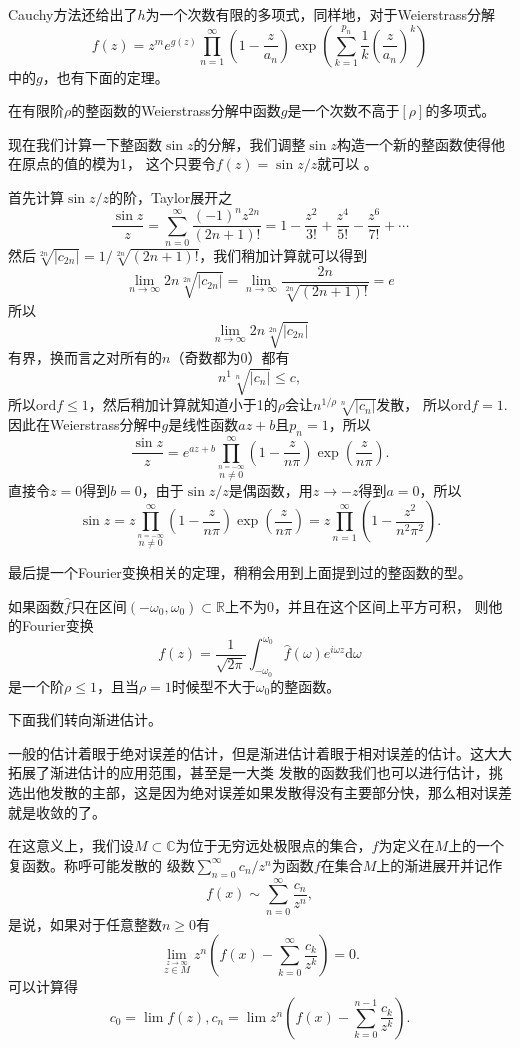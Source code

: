 Cauchy方法还给出了$h$为一个次数有限的多项式，同样地，对于Weierstrass分解
\[
f(z)=z^me^{g(z)}\prod_{n=1}^\infty  \left(1-\frac{z}{a_n}\right)\exp\left(\sum_{k=1}^{p_n}
\frac{1}{k}\left(\frac{z}{a_n}\right)^k\right)
\]
中的$g$，也有下面的定理。
\begin{thm}[Hadamard]
在有限阶$\rho$的整函数的Weierstrass分解中函数$g$是一个次数不高于$[\rho]$的多项式。
\end{thm}
现在我们计算一下整函数$\sin z$的分解，我们调整$\sin z$构造一个新的整函数使得他在原点的值的模为1，
这个只要令$f(z)=\sin z /z$就可以 。

首先计算$\sin z /z$的阶，Taylor展开之
\[
\frac{\sin z}{z}= \sum_{n=0}^\infty \frac{(-1)^nz^{2n}}{(2n+1)!}= 1 - \frac{z^2}{3!} + \frac{z^4}{5!} - 
\frac{z^6}{7!} + \cdots 
\]
然后$\sqrt[2n]{|c_{2n}|}=1/\sqrt[2n]{(2n+1)!}$，我们稍加计算就可以得到
\[
\lim_{n\to \infty} 2n\sqrt[2n]{|c_{2n}|}=\lim_{n\to \infty} \frac{2n}{\sqrt[2n]{(2n+1)!}}=e
\]
所以\[\lim_{n\to \infty} 2n\sqrt[2n]{|c_{2n}|}\]有界，换而言之对所有的$n$（奇数都为0）都有
\[
n^{1}\sqrt[n]{|c_n|}\leq c,
\]
所以$\mathrm{ord} f\leq 1$，然后稍加计算就知道小于1的$\rho$会让$n^{1/\rho}\sqrt[n]{|c_n|}$发散，
所以$\mathrm{ord} f=1$.因此在Weierstrass分解中$g$是线性函数$az+b$且$p_n=1$，所以
\[
\frac{\sin z}{z}=e^{az+b}\prod_{\stackrel{n=-\infty}{n\neq 0}}^\infty  \left(1-\frac{z}{n\pi}\right)
\exp\left(\frac{z}{n\pi}\right).
\]
直接令$z=0$得到$b=0$，由于$\sin z/z$是偶函数，用$z \to -z$得到$a=0$，所以
\[
\sin z=z\prod_{\stackrel{n=-\infty}{n\neq 0}}^\infty  \left(1-\frac{z}{n\pi}\right)\exp\left(\frac{z}{n\pi}\right)
=z\prod_{n=1}^\infty  \left(1-\frac{z^2}{n^2\pi^2}\right).
\]

最后提一个Fourier变换相关的定理，稍稍会用到上面提到过的整函数的型。
\begin{pro}
如果函数$\hat{f}$只在区间$(-\omega_0,\omega_0)\subset \mathbb{R}$上不为$0$，并且在这个区间上平方可积，
则他的Fourier变换
\[
f(z)=\frac{1}{\sqrt{2\pi}}\int_{-\omega_0}^{\omega_0} \hat{f}(\omega)e^{i\omega z}\mathrm{d}\omega
\]
是一个阶$\rho\leq 1$，且当$\rho =1$时候型不大于$\omega_0$的整函数。
\end{pro}

下面我们转向渐进估计。

一般的估计着眼于绝对误差的估计，但是渐进估计着眼于相对误差的估计。这大大拓展了渐进估计的应用范围，甚至是一大类
发散的函数我们也可以进行估计，挑选出他发散的主部，这是因为绝对误差如果发散得没有主要部分快，那么相对误差就是收敛的了。

在这意义上，我们设$M\subset \mathbb{C}$为位于无穷远处极限点的集合，$f$为定义在$M$上的一个复函数。称呼可能发散的
级数$\sum_{n=0}^\infty c_n/z^n$为函数$f$在集合$M$上的渐进展开并记作
\[
f(x) \sim \sum_{n=0}^\infty \frac{c_n}{z^n},
\]
是说，如果对于任意整数$n\geq 0$有
\[
\lim_{\stackrel{z\to \infty}{z\in M}}z^n\left( f(x)-\sum_{k=0}^\infty \frac{c_k}{z^k}\right)=0.
\]
可以计算得
\[
c_0=\lim f(z), c_n=\lim z^n\left( f(x)-\sum_{k=0}^{n-1} \frac{c_k}{z^k}\right).
\]

